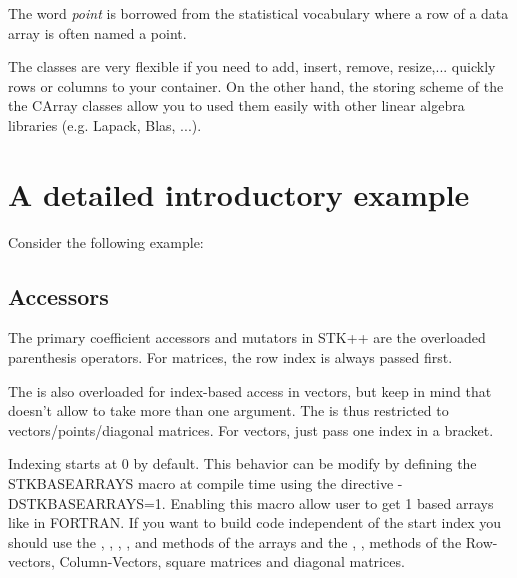 \documentclass[a4paper,10pt]{article}
\begin{document}
The word \emph{point} is borrowed from the statistical vocabulary where a row
of a data array is often named a point.

The  classes are very flexible if you need to add, insert, remove,
resize,... quickly rows or columns to your container. On the other hand, the
storing scheme of the the CArray classes allow you to used them easily with
other linear algebra libraries (e.g. Lapack, Blas, ...).

\section{A detailed introductory example}
Consider the following example:

\begin{minipage}[t]{0.66\textwidth}

\end{minipage}
\hspace{0.2cm}
\begin{minipage}[t]{0.33\textwidth}
\addtocounter{lstlisting}{-1}

\end{minipage}

\subsection{Accessors}
The primary coefficient accessors and mutators in STK++ are the overloaded
parenthesis operators. For matrices, the row index is always
passed first.

The  is also overloaded for index-based access in
vectors, but keep in mind that \Cpp{} doesn't allow  to take
more than one argument. The  is thus restricted to
vectors/points/diagonal matrices. For vectors, just pass one index in a bracket.

Indexing starts at 0 by default. This behavior can be modify by defining the
STKBASEARRAYS macro at compile time using the directive -DSTKBASEARRAYS=1.
Enabling this macro allow user to get 1 based arrays like in FORTRAN.
If you want to build code independent of the start index you should use the
, , , ,
 and  methods of the arrays and the
, ,  methods of the Row-vectors,
Column-Vectors, square matrices and diagonal matrices.
\end{document}
